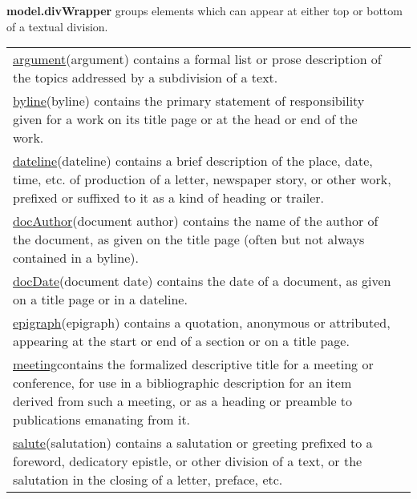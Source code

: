 \begin{sansreflist}
\item [\textbf{model.divWrapper}] groups elements which can appear at either top or bottom of a textual division. \par 
\begin{longtable}{P{0.15225669957686883\textwidth}P{0.6977433004231312\textwidth}}
\hyperref[TEI.argument]{argument}\tabcellsep (argument) contains a formal list or prose description of the topics addressed by a subdivision of a text.\\
\hyperref[TEI.byline]{byline}\tabcellsep (byline) contains the primary statement of responsibility given for a work on its title page or at the head or end of the work.\\
\hyperref[TEI.dateline]{dateline}\tabcellsep (dateline) contains a brief description of the place, date, time, etc. of production of a letter, newspaper story, or other work, prefixed or suffixed to it as a kind of heading or trailer.\\
\hyperref[TEI.docAuthor]{docAuthor}\tabcellsep (document author) contains the name of the author of the document, as given on the title page (often but not always contained in a byline).\\
\hyperref[TEI.docDate]{docDate}\tabcellsep (document date) contains the date of a document, as given on a title page or in a dateline.\\
\hyperref[TEI.epigraph]{epigraph}\tabcellsep (epigraph) contains a quotation, anonymous or attributed, appearing at the start or end of a section or on a title page.\\
\hyperref[TEI.meeting]{meeting}\tabcellsep contains the formalized descriptive title for a meeting or conference, for use in a bibliographic description for an item derived from such a meeting, or as a heading or preamble to publications emanating from it.\\
\hyperref[TEI.salute]{salute}\tabcellsep (salutation) contains a salutation or greeting prefixed to a foreword, dedicatory epistle, or other division of a text, or the salutation in the closing of a letter, preface, etc.\end{longtable} \par
 
\end{sansreflist}

